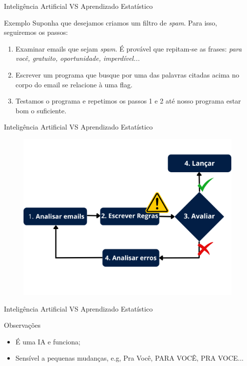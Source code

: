 \begin{frame}{Inteligência Artificial VS Aprendizado Estatístico}
	\begin{block}{Exemplo}
		\justifying
		Suponha que desejamos criamos um filtro de \textit{spam}.
		Para isso, seguiremos os passos:
		\begin{enumerate}
			\justifying
			\item Examinar emails que sejam \textit{spam}.
			É provável que repitam-se as frases: \textit{para você, gratuito, oportunidade, imperdível...}
			\item Escrever um programa que busque por uma das palavras citadas acima no corpo do email se relacione à uma flag.
			\item Testamos o programa e repetimos os passos 1 e 2 até nosso programa estar bom o suficiente. 
		\end{enumerate}
	\end{block}
\end{frame}
\begin{frame}{Inteligência Artificial VS Aprendizado Estatístico}
	\begin{figure}[h]
		\includegraphics[scale=0.4]{imagens//secao1/tradicionalspam.png}
	\end{figure}
\end{frame}


\begin{frame}{Inteligência Artificial VS Aprendizado Estatístico}
	\begin{block}{Observações}
		\begin{itemize}
			\item É uma IA e funciona;
			\item Sensível a pequenas mudanças, e.g, Pra Você, PARA VOCÊ, PRA VOCE...
		\end{itemize}
	\end{block}
\end{frame}

